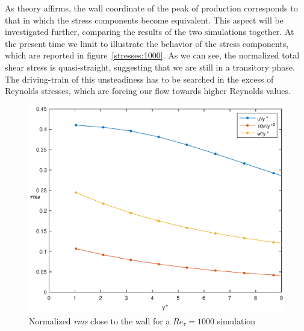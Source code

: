 As theory affirms, the wall coordinate of the peak of production corresponds to that in which the stress components become equivalent. This aspect will be investigated further, comparing the results of the two simulations together.
At the present time we limit to illustrate the behavior of the stress components, which are reported in figure~\ref{stresses:1000}. As we can see, the normalized total shear stress is quasi-straight, suggesting that we are still in a transitory phase. The driving-train of this unsteadiness has to be searched in the excess of Reynolds stresses, which are forcing our flow towards higher Reynolds values. \par
\begin{figure}
\begin{center}
\includegraphics[scale=0.55]{grafici/wall_rms_1000.eps}
\caption{Normalized \emph{rms} close to the wall for a $Re_{\tau}=1000$ simulation}
\label{wall:rms:1000}
\end{center} 
\end{figure}

